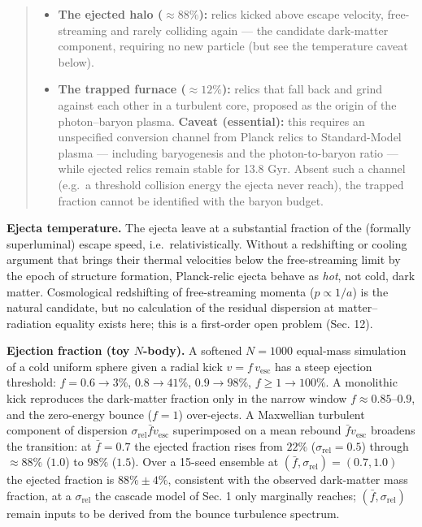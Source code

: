 \documentclass[
]{article}
\providecommand{\tightlist}{%
  \setlength{\itemsep}{0pt}\setlength{\parskip}{0pt}}
\begin{document}
\begin{quote}
\begin{itemize}
\tightlist
\item
  \textbf{The ejected halo (\(\approx 88\%\)):} relics kicked above
  escape velocity, free-streaming and rarely colliding again --- the
  candidate dark-matter component, requiring no new particle (but see
  the temperature caveat below).
\item
  \textbf{The trapped furnace (\(\approx 12\%\)):} relics that fall back
  and grind against each other in a turbulent core, proposed as the
  origin of the photon--baryon plasma. \textbf{Caveat (essential):} this
  requires an unspecified conversion channel from Planck relics to
  Standard-Model plasma --- including baryogenesis and the
  photon-to-baryon ratio --- while ejected relics remain stable for 13.8
  Gyr. Absent such a channel (e.g.~a threshold collision energy the
  ejecta never reach), the trapped fraction cannot be identified with
  the baryon budget.
\end{itemize}
\end{quote}

\textbf{Ejecta temperature.} The ejecta leave at a substantial fraction
of the (formally superluminal) escape speed, i.e.~relativistically.
Without a redshifting or cooling argument that brings their thermal
velocities below the free-streaming limit by the epoch of structure
formation, Planck-relic ejecta behave as \emph{hot}, not cold, dark
matter. Cosmological redshifting of free-streaming momenta
(\(p \propto 1/a\)) is the natural candidate, but no calculation of the
residual dispersion at matter--radiation equality exists here; this is a
first-order open problem (Sec. 12).

\textbf{Ejection fraction (toy \(N\)-body).} A softened \(N = 1000\)
equal-mass simulation of a cold uniform sphere given a radial kick
\(v = f\,v_{\text{esc}}\) has a steep ejection threshold:
\(f = 0.6 \to 3\%\), \(0.8 \to 41\%\), \(0.9 \to 98\%\),
\(f \geq 1 \to 100\%\). A monolithic kick reproduces the dark-matter
fraction only in the narrow window \(f \approx 0.85\)--\(0.9\), and the
zero-energy bounce (\(f = 1\)) over-ejects. A Maxwellian turbulent
component of dispersion \(\sigma_{\text{rel}}\bar{f}v_{\text{esc}}\)
superimposed on a mean rebound \(\bar{f}v_{\text{esc}}\) broadens the
transition: at \(\bar{f} = 0.7\) the ejected fraction rises from
\(22\%\) (\(\sigma_{\text{rel}} = 0.5\)) through \(\approx 88\%\)
(\(1.0\)) to \(98\%\) (\(1.5\)). Over a 15-seed ensemble at
\((\bar{f}, \sigma_{\text{rel}}) = (0.7, 1.0)\) the ejected fraction is
\(88\% \pm 4\%\), consistent with the observed dark-matter mass
fraction, at a \(\sigma_{\text{rel}}\) the cascade model of Sec. 1 only
marginally reaches; \((\bar{f}, \sigma_{\text{rel}})\) remain inputs to
be derived from the bounce turbulence spectrum.
\end{document}
